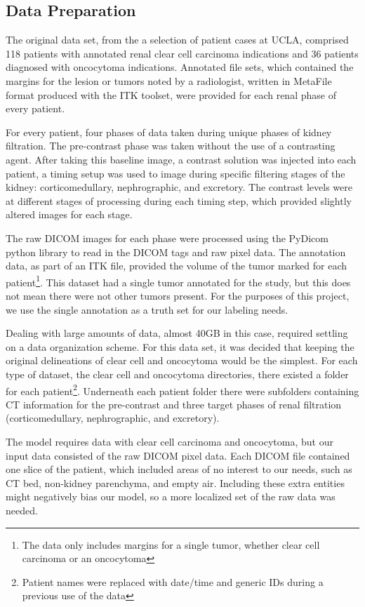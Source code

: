 \documentclass[conference]{IEEEtran}
\begin{document}
\subsection{Data Preparation}

The original data set, from the a selection of patient cases at UCLA\cite{b5}, comprised 118 patients with annotated renal clear cell carcinoma indications and 36 patients diagnosed with oncocytoma indications. Annotated file sets, which contained the margins for the lesion or tumors noted by a radiologist, written in MetaFile format produced with the ITK toolset\cite{b9}, were provided for each renal phase of every patient.

For every patient, four phases of data taken during unique phases of kidney filtration. The pre-contrast phase was taken without the use of a contrasting agent. After taking this baseline image, a contrast solution was injected into each patient, a timing setup was used to image during specific filtering stages of the kidney: corticomedullary, nephrographic, and excretory. The contrast levels were at different stages of processing during each timing step, which provided slightly altered images for each stage.

The raw DICOM images for each phase were processed using the PyDicom\cite{b8} python library to read in the DICOM tags and raw pixel data. The annotation data, as part of an ITK file, provided the volume of the tumor marked for each patient\footnote{The data only includes margins for a single tumor, whether clear cell carcinoma or an oncocytoma}. This dataset had a single tumor annotated for the study, but this does not mean there were not other tumors present. For the purposes of this project, we use the single annotation as a truth set for our labeling needs.

Dealing with large amounts of data, almost 40GB in this case, required settling on a data organization scheme. For this data set, it was decided that keeping the original delineations of clear cell and oncocytoma would be the simplest. For each type of dataset, the clear cell and oncocytoma directories, there existed a folder for each patient\footnote{Patient names were replaced with date/time and generic IDs during a previous use of the data}. Underneath each patient folder there were subfolders containing CT information for the pre-contrast and three target phases of renal filtration (corticomedullary, nephrographic, and excretory).

The model requires data with clear cell carcinoma and oncocytoma, but our input data consisted of the raw DICOM pixel data. Each DICOM file contained one slice of the patient, which included areas of no interest to our needs, such as CT bed, non-kidney parenchyma, and empty air. Including these extra entities might negatively bias our model, so a more localized set of the raw data was needed. 
\end{document}
